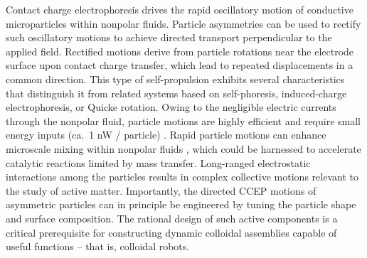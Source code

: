 Contact charge electrophoresis drives the rapid oscillatory motion of conductive microparticles within nonpolar fluids.
Particle asymmetries can be used to rectify such oscillatory motions to achieve directed transport perpendicular to the applied field.
Rectified motions derive from particle rotations near the electrode surface upon contact charge transfer, which lead to repeated displacements in a common direction.
This type of self-propulsion exhibits several characteristics that distinguish it from related systems based on self-phoresis, induced-charge electrophoresis, or Quicke rotation.
Owing to the negligible electric currents through the nonpolar fluid, particle motions are highly efficient and require small energy inputs (ca.~1 nW / particle) \autocite{drews2015contact}. 
Rapid particle motions can enhance microscale mixing within nonpolar fluids \autocite{cartier2014microfluidic}, which could be harnessed to accelerate catalytic reactions limited by mass transfer.
Long-ranged electrostatic interactions among the particles results in complex collective motions relevant to the study of active matter.
Importantly, the directed CCEP motions of asymmetric particles can in principle be engineered by tuning the particle shape and surface composition.
The rational design of such active components is a critical prerequisite for constructing dynamic colloidal assemblies capable of useful functions -- that is, colloidal robots.









